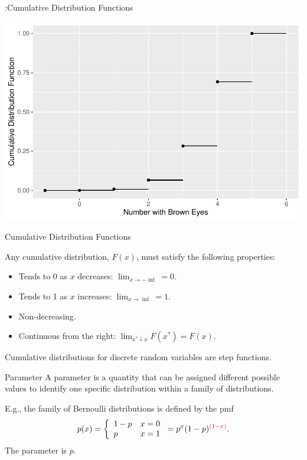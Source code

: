 \begin{frame}

  \begin{block}{\examplectd:Cumulative Distribution Functions}

    \begin{center}
      \includegraphics[height=.6\textheight]{figure/example-10-1-4-1}
    \end{center}
  \end{block}
\end{frame}



\begin{frame}
  \begin{block}{Cumulative Distribution Functions}

  Any cumulative distribution, $F(x)$, must satisfy the following properties:
  \begin{itemize}
  \item Tends to 0 as $x$ decreases: $\lim_{x \to -\inf}=0$.
  \item Tends to 1 as $x$ increases: $\lim_{x \to \inf}=1$.
  \item Non-decreasing.
  \item Continuous from the right: $\lim_{x^* \downarrow x} F(x^*)=F(x)$.
  \end{itemize}

  \bigskip

  Cumulative distributions for discrete random variables are step functions.
  \end{block}
\end{frame}

\begin{frame}
  \begin{block}{Parameter}
    A parameter is a quantity that can be assigned different possible values to identify one specific distribution within a family of distributions.

    E.g., the family of Bernoulli distributions is defined by the pmf
    \[
      p(x)=\left\{
        \begin{array}{ll}
          1-p &x=0\\
          p & x=1
        \end{array}
      \right.
      =p^x(1-p)^{\textcolor{red}{(1-x)}}.
    \]
    The parameter is $p$. 
  \end{block}
\end{frame}

